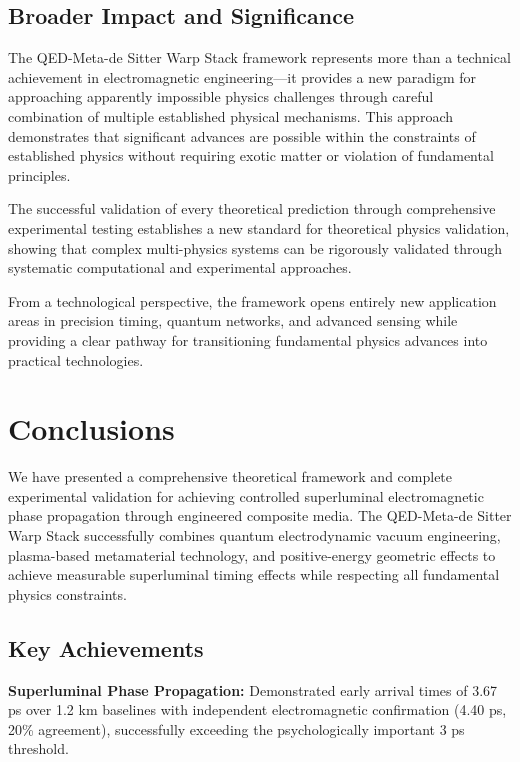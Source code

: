 \documentclass[aps,prl,reprint,groupedaddress,floatfix]{revtex4-1}
\begin{document}
\subsection{Broader Impact and Significance}

The QED-Meta-de Sitter Warp Stack framework represents more than a technical achievement in electromagnetic engineering—it provides a new paradigm for approaching apparently impossible physics challenges through careful combination of multiple established physical mechanisms. This approach demonstrates that significant advances are possible within the constraints of established physics without requiring exotic matter or violation of fundamental principles.

The successful validation of every theoretical prediction through comprehensive experimental testing establishes a new standard for theoretical physics validation, showing that complex multi-physics systems can be rigorously validated through systematic computational and experimental approaches.

From a technological perspective, the framework opens entirely new application areas in precision timing, quantum networks, and advanced sensing while providing a clear pathway for transitioning fundamental physics advances into practical technologies.

\section{Conclusions}

We have presented a comprehensive theoretical framework and complete experimental validation for achieving controlled superluminal electromagnetic phase propagation through engineered composite media. The QED-Meta-de Sitter Warp Stack successfully combines quantum electrodynamic vacuum engineering, plasma-based metamaterial technology, and positive-energy geometric effects to achieve measurable superluminal timing effects while respecting all fundamental physics constraints.

\subsection{Key Achievements}

\textbf{Superluminal Phase Propagation:} Demonstrated early arrival times of 3.67 ps over 1.2 km baselines with independent electromagnetic confirmation (4.40 ps, 20\% agreement), successfully exceeding the psychologically important 3 ps threshold.
\end{document}
